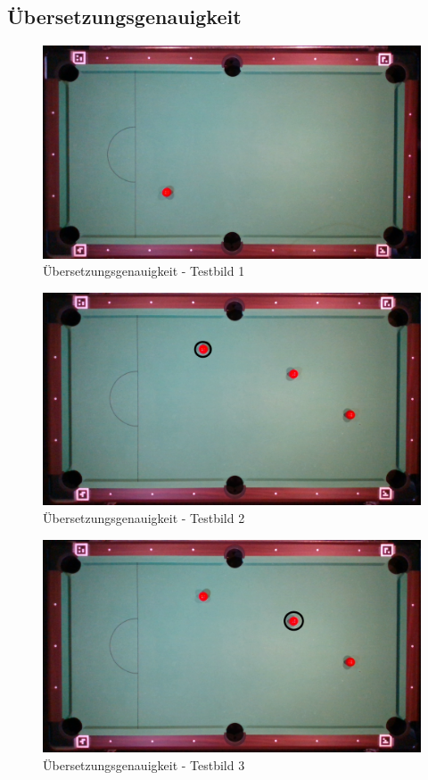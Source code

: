 \subsection{Übersetzungsgenauigkeit}\label{anhang:uebersetzungsgenauigkeit:testbilder}
\begin{figure}[h!]
    \begin{center}
        \includegraphics[width=0.8\linewidth]{../common/07_appendix/resources/01_translation/00_translation_testbild_1.png}
    \end{center}
    \caption{Übersetzungsgenauigkeit - Testbild 1}
    \label{fig:uebersetzungsgenauigkeit:testbild:1}
\end{figure}
\begin{figure}[h!]
    \begin{center}
        \includegraphics[width=0.8\linewidth]{../common/07_appendix/resources/01_translation/01_translation_testbild_2.png}
    \end{center}
    \caption{Übersetzungsgenauigkeit - Testbild 2}
    \label{fig:uebersetzungsgenauigkeit:testbild:2}
\end{figure}
\begin{figure}[h!]
    \begin{center}
        \includegraphics[width=0.8\linewidth]{../common/07_appendix/resources/01_translation/02_translation_testbild_3.png}
    \end{center}
    \caption{Übersetzungsgenauigkeit - Testbild 3}
    \label{fig:uebersetzungsgenauigkeit:testbild:3}
\end{figure}
